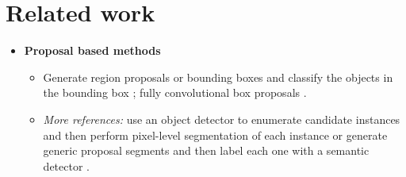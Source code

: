 
\section{Related work}
\begin{itemize}
\item \textbf{Proposal based methods} 
\begin{itemize}
\item Generate region proposals or bounding boxes and classify the objects in the bounding box \cite{yang2012layered,ladicky2010and,hariharan2014simultaneous,chen2015multi,dai2016instance,liang2016reversible,he2017mask}; fully convolutional  box proposals \cite{li2017fully}. 
\item \emph{More references:} use an object detector to enumerate candidate instances and then perform pixel-level segmentation of each instance \cite{liang2018proposal,dai2016instance,li2017fully,liang2016reversible,arnab2017pixelwise} or generate generic proposal segments and then label each one with a semantic detector \cite{hariharan2014simultaneous,chen2015multi,hariharan2015hypercolumns,dai2015convolutional,uhrig2016pixel,he2017mask}.
\end{itemize}


\end{itemize}

